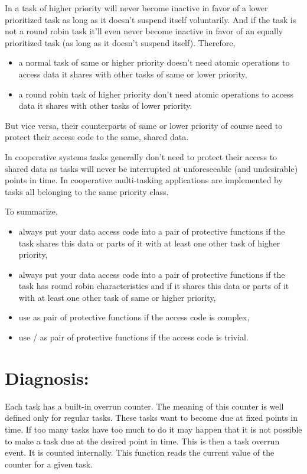 In \rtos{} a task of higher priority will never become inactive in favor
of a lower prioritized task as long as it doesn't suspend itself
voluntarily. And if the task is not a round robin task it'll even never
become inactive in favor of an equally prioritized task (as long as it
doesn't suspend itself). Therefore,
\begin{itemize}
  \item a normal task of same or higher priority doesn't need atomic
    operations to access data it shares with other tasks of same or lower
    priority,
  \item a round robin task of higher priority don't need atomic operations
    to access data it shares with other tasks of lower priority.
\end{itemize}
But vice versa, their counterparts of same or lower priority of course need to
protect their access code to the same, shared data.

In cooperative systems tasks generally don't need to protect their access
to shared data as tasks will never be interrupted at unforeseeable (and
undesirable) points in time. In \rtos{} cooperative multi-tasking
applications are implemented by tasks all belonging to the same priority
class.

To summarize, 
\begin{itemize}
  \item always put your data access code into a pair of protective
    functions if the task shares this data or parts of it with at least
    one other task of higher priority,
  \item always put your data access code into a pair of protective
    functions if the task has round robin characteristics and if it shares
    this data or parts of it with at least one other task of same or higher
    priority,
  \item use  as pair of protective
    functions if the access code is complex,
  \item use / as pair of protective functions if the
    access code is trivial.
\end{itemize}


\section{Diagnosis: }

Each task has a built-in overrun counter. The meaning of this counter is
well defined only for regular tasks. These tasks want to become due at
fixed points in time. If too many tasks have too much to do it may happen
that it is not possible to make a task due at the desired point in time.
This is then a task overrun event. It is counted internally. This function
reads the current value of the counter for a given task.

